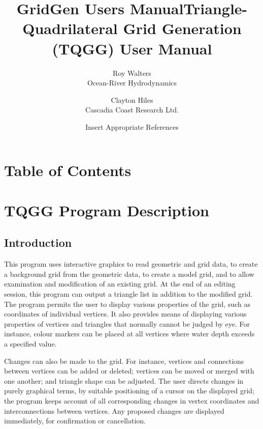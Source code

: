 \documentclass{article}
\title{GridGen Users Manual}
\begin{document}
\title{Triangle-Quadrilateral Grid Generation (TQGG) User Manual}

\author{Roy Walters \\
  Ocean-River Hydrodynamics \\
\and
  Clayton Hiles \\
  Cascadia Coast Research Ltd. \\
\and
Insert Appropriate References}

\maketitle


\section*{Table of Contents}

\setcounter{tocdepth}{2}
\tableofcontents


\section{TQGG Program Description}

\label{bkm:Ref406485171}\label{bkm:Ref406484745}\subsection{Introduction}
This program uses interactive graphics to read geometric and grid data, to create a background grid from the geometric data, to create a model grid, and to allow examination and modification of an existing grid. At the end of an editing session, this program can output a triangle list in addition to the modified grid. The program permits the user to display various properties of the grid, such as coordinates of individual vertices. It also provides means of displaying various properties of vertices and triangles that normally cannot be judged by eye. For instance, colour markers can be placed at all vertices where water depth exceeds a specified value.

Changes can also be made to the grid. For instance, vertices and connections between vertices can be added or deleted; vertices can be moved or merged with one another; and triangle shape can be adjusted. The user directs changes in purely graphical terms, by suitable positioning of a cursor on the displayed grid; the program keeps account of all corresponding changes in vertex coordinates and interconnections between vertices. Any proposed changes are displayed immediately, for confirmation or cancellation.
\end{document}
